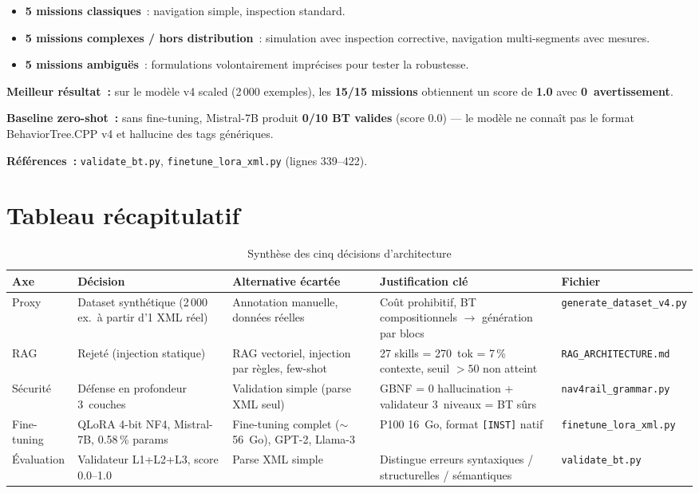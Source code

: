 \documentclass[a4paper,11pt]{article}
\newcommand{\file}[1]{\texttt{#1}}
\begin{document}
\begin{itemize}
    \item \textbf{5 missions classiques}~: navigation simple, inspection
    standard.
    \item \textbf{5 missions complexes / hors distribution}~: simulation
    avec inspection corrective, navigation multi-segments avec mesures.
    \item \textbf{5 missions ambiguës}~: formulations volontairement
    imprécises pour tester la robustesse.
\end{itemize}

\textbf{Meilleur résultat~:} sur le modèle v4 scaled (2\,000 exemples),
les \textbf{15/15 missions} obtiennent un score de \textbf{1.0} avec
\textbf{0~avertissement}.

\textbf{Baseline zero-shot~:} sans fine-tuning, Mistral-7B produit
\textbf{0/10 BT valides} (score 0.0) --- le modèle ne connaît pas le
format BehaviorTree.CPP v4 et hallucine des tags génériques.

\textbf{Références~:} \file{validate\_bt.py},
\file{finetune\_lora\_xml.py} (lignes 339--422).

\newpage
\section{Tableau récapitulatif}
\label{sec:recap}

\begin{table}[h]
\centering
\caption{Synthèse des cinq décisions d'architecture}
\label{tab:recap}
\small
\begin{tabularx}{\textwidth}{@{}l X X X l@{}}
\toprule
\textbf{Axe} & \textbf{Décision} & \textbf{Alternative écartée} &
\textbf{Justification clé} & \textbf{Fichier} \\
\midrule
Proxy & Dataset synthétique (2\,000 ex.\ à partir d'1 XML réel) &
Annotation manuelle, données réelles & Coût prohibitif, BT
compositionnels $\rightarrow$ génération par blocs &
\file{generate\_dataset\_v4.py} \\
\addlinespace
RAG & Rejeté (injection statique) & RAG vectoriel, injection par règles,
few-shot & 27 skills = 270~tok = 7\,\% contexte, seuil $>50$ non atteint &
\file{RAG\_ARCHITECTURE.md} \\
\addlinespace
Sécurité & Défense en profondeur 3~couches & Validation simple (parse
XML seul) & GBNF = 0 hallucination + validateur 3~niveaux = BT sûrs &
\file{nav4rail\_grammar.py} \\
\addlinespace
Fine-tuning & QLoRA 4-bit NF4, Mistral-7B, 0.58\,\% params &
Fine-tuning complet ($\sim$56~Go), GPT-2, Llama-3 &
P100 16~Go, format \texttt{[INST]} natif &
\file{finetune\_lora\_xml.py} \\
\addlinespace
Évaluation & Validateur L1+L2+L3, score 0.0--1.0 & Parse XML simple &
Distingue erreurs syntaxiques / structurelles / sémantiques &
\file{validate\_bt.py} \\
\bottomrule
\end{tabularx}
\end{table}
\end{document}

